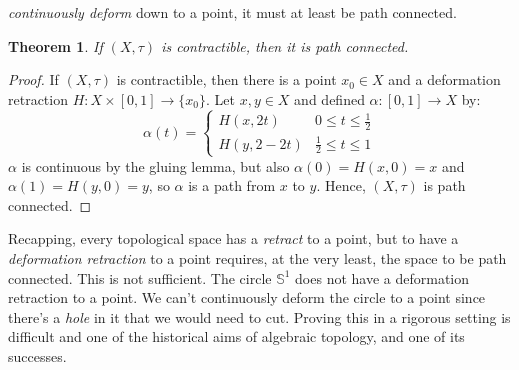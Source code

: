 \documentclass{article}
\theoremstyle{plain}
\newtheorem{theorem}{Theorem}[section]
\theoremstyle{normal}
\begin{document}
        \textit{continuously deform} down to a point, it must at least be
        path connected.
        \begin{theorem}
            If $(X,\tau)$ is contractible, then it is path connected.
        \end{theorem}
        \begin{proof}
            If $(X,\tau)$ is contractible, then there is a point $x_{0}\in{X}$
            and a deformation retraction $H:X\times[0,1]\rightarrow\{x_{0}\}$.
            Let $x,y\in{X}$ and defined $\alpha:[0,1]\rightarrow{X}$ by:
            \begin{equation}
                \alpha(t)=
                \begin{cases}
                    H(x,2t)&0\leq{t}\leq\frac{1}{2}\\
                    H(y,2-2t)&\frac{1}{2}\leq{t}\leq{1}
                \end{cases}
            \end{equation}
            $\alpha$ is continuous by the gluing lemma, but also
            $\alpha(0)=H(x,0)=x$ and $\alpha(1)=H(y,0)=y$, so $\alpha$ is a
            path from $x$ to $y$. Hence, $(X,\tau)$ is path connected.
        \end{proof}
        Recapping, every topological space has a \textit{retract} to a
        point, but to have a \textit{deformation retraction} to a point
        requires, at the very least, the space to be path connected. This is
        not sufficient. The circle $\mathbb{S}^{1}$ does not have a
        deformation retraction to a point. We can't continuously deform the
        circle to a point since there's a \textit{hole} in it that we would
        need to cut. Proving this in a rigorous setting is difficult and one
        of the historical aims of algebraic topology, and one of its successes.
\end{document}
